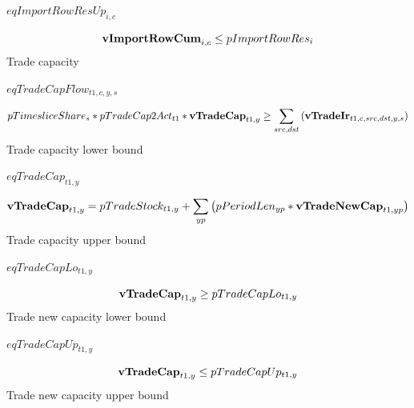 \documentclass{article}
\begin{document}
$eqImportRowResUp_{i,c}$





\begin{dmath}
{\bf vImportRowCum}_{i,c}  \le  pImportRowRes_{i}
\end{dmath}
Trade capacity







$eqTradeCapFlow_{t1,c,y,s}$





\begin{dmath}
pTimesliceShare_{s}*pTradeCap2Act_{t1}*{\bf vTradeCap}_{t1,y}  \ge  \sum_{src,dst}{\left({\bf vTradeIr}_{t1,c,src,dst,y,s}\right)}
\end{dmath}
Trade capacity lower bound







$eqTradeCap_{t1,y}$





\begin{dmath}
{\bf vTradeCap}_{t1,y}  =  pTradeStock_{t1,y}+\sum_{yp}{\left(pPeriodLen_{yp}*{\bf vTradeNewCap}_{t1,yp}\right)}
\end{dmath}
Trade capacity upper bound







$eqTradeCapLo_{t1,y}$





\begin{dmath}
{\bf vTradeCap}_{t1,y}  \ge  pTradeCapLo_{t1,y}
\end{dmath}
Trade new capacity lower bound







$eqTradeCapUp_{t1,y}$





\begin{dmath}
{\bf vTradeCap}_{t1,y}  \le  pTradeCapUp_{t1,y}
\end{dmath}
Trade new capacity upper bound
\end{document}
